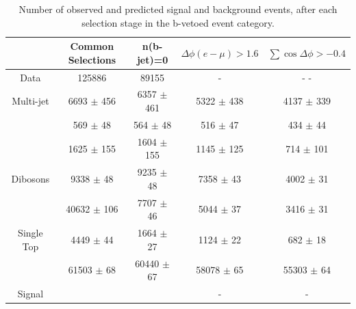 \begin{table}[tp]
  \centering
   \begin{footnotesize}	
  \begin{tabular}{ccccc}
    \hline\hline
	&	Common Selections			&	n(b-jet)=0			&	$\Delta\phi(e-\mu)>1.6$			&	$\sum\cos\Delta\phi > -0.4$ 		\\	
    \hline
   \hline
Data	&	125886			&	89155			&	-			&	-				-			\\
   \hline
Multi-jet	&	6693	$\pm$	456	&	6357	$\pm$	461	&	5322	$\pm$	438	&	4137	$\pm$	339	\\
\Zll 	&	569	$\pm$	48	&	564	$\pm$	48	&	516	$\pm$	47	&	434	$\pm$	44		\\
\Wlnu	&	1625	$\pm$	155	&	1604	$\pm$	155	&	1145	$\pm$	125	&	714	$\pm$	101		\\
Dibosons	&	9338	$\pm$	48	&	9235	$\pm$	48	&	7358	$\pm$	43	&	4002	$\pm$	31		\\
\ttbar	&	40632	$\pm$	106	&	7707	$\pm$	46	&	5044	$\pm$	37	&	3416	$\pm$	31		\\
Single Top	&	4449	$\pm$	44	&	1664	$\pm$	27	&	1124	$\pm$	22	&	682	$\pm$	18	\\
\Ztautau	&	61503	$\pm$	68	&	60440	$\pm$	67	&	58078	$\pm$	65	&	55303	$\pm$	64	\\
Signal	&				&				&	-			&	-						\\
    \hline
  \end{tabular}
  \caption{Number of observed and predicted signal and background events, after each selection stage in the b-vetoed event category.}
  \label{tab:eventsel:bveto}
   \end{footnotesize}	
\end{table}

